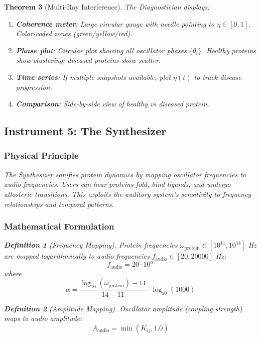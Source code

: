 \documentclass[11pt,a4paper]{article}
\newtheorem{theorem}{Theorem}[section]
\newtheorem{definition}[theorem]{Definition}
\begin{document}
\begin{theorem}[Multi-Ray Interference]
The Diagnostician displays:
\begin{enumerate}
\item \textbf{Coherence meter}: Large circular gauge with needle pointing to $\eta \in [0,1]$. Color-coded zones (green/yellow/red).
\item \textbf{Phase plot}: Circular plot showing all oscillator phases $\{\theta_i\}$. Healthy proteins show clustering; diseased proteins show scatter.
\item \textbf{Time series}: If multiple snapshots available, plot $\eta(t)$ to track disease progression.
\item \textbf{Comparison}: Side-by-side view of healthy vs diseased protein.
\end{enumerate}

\subsection{Instrument 5: The Synthesizer}

\subsubsection{Physical Principle}

The Synthesizer sonifies protein dynamics by mapping oscillator frequencies to audio frequencies. Users can \textit{hear} proteins fold, bind ligands, and undergo allosteric transitions. This exploits the auditory system's sensitivity to frequency relationships and temporal patterns.

\subsubsection{Mathematical Formulation}

\begin{definition}[Frequency Mapping]
Protein frequencies $\omega_{\text{protein}} \in [10^{11}, 10^{14}]$ Hz are mapped logarithmically to audio frequencies $f_{\text{audio}} \in [20, 20000]$ Hz:
\begin{equation}
f_{\text{audio}} = 20 \cdot 10^{\alpha}
\end{equation}
where
\begin{equation}
\alpha = \frac{\log_{10}(\omega_{\text{protein}}) - 11}{14 - 11} \cdot \log_{10}(1000)
\end{equation}
\end{definition}

\begin{definition}[Amplitude Mapping]
Oscillator amplitude (coupling strength) maps to audio amplitude:
\begin{equation}
A_{\text{audio}} = \min(K_{ij}, 1.0)
\end{equation}
\end{definition}


\end{theorem}
\end{document}
